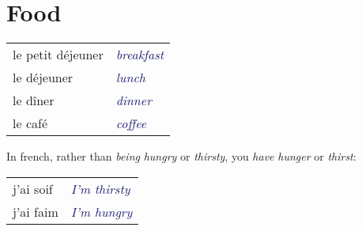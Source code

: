 \documentclass{microdoc} %
\newcommand\lEng[1]{\textcolor{MidnightBlue}{{\it #1}}}
\begin{document}
%
%

\section{Food} %
\begin{table}[H]
    \begin{tabular}{l l}
        le petit déjeuner                        & \lEng{breakfast}\\
        le déjeuner                              & \lEng{lunch}\\
        le dîner                                 & \lEng{dinner}\\
        le café                                  & \lEng{coffee}\\
    \end{tabular}
\end{table}

In french, rather than \emph{being} {\it hungry} or {\it thirsty}, you \emph{have} {\it hunger} or {\it thirst}:
\begin{table}[H]
    \begin{tabular}{l l}
        j'ai soif   & \lEng{I'm thirsty}\\
        j'ai faim   & \lEng{I'm hungry}\\
    \end{tabular}
\end{table}
\end{document}
